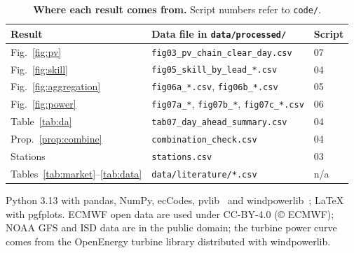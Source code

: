 \begin{table}[h]
\centering\small
\caption{\textbf{Where each result comes from.} Script numbers refer to \texttt{code/}.}
\label{tab:map}
\setlength{\tabcolsep}{3pt}
\begin{tabular}{@{}L{1.55cm}L{4.95cm}l@{}}
\toprule
Result & Data file in \texttt{data/processed/} & Script \\
\midrule
Fig.~\ref{fig:pv} & \nolinkurl{fig03_pv_chain_clear_day.csv} & 07 \\
Fig.~\ref{fig:skill} & \nolinkurl{fig05_skill_by_lead_*.csv} & 04 \\
Fig.~\ref{fig:aggregation} & \nolinkurl{fig06a_*.csv}, \nolinkurl{fig06b_*.csv} & 05 \\
Fig.~\ref{fig:power} & \nolinkurl{fig07a_*}, \nolinkurl{fig07b_*}, \nolinkurl{fig07c_*.csv} & 06 \\
Table~\ref{tab:da} & \nolinkurl{tab07_day_ahead_summary.csv} & 04 \\
Prop.~\ref{prop:combine} & \nolinkurl{combination_check.csv} & 04 \\
Stations & \nolinkurl{stations.csv} & 03 \\
Tables~\ref{tab:market}--\ref{tab:data} & \nolinkurl{data/literature/*.csv} & n/a \\
\bottomrule
\end{tabular}
\end{table}

 Python 3.13 with pandas, NumPy, ecCodes, pvlib~\cite{holmgren2018pvlib} and windpowerlib~\cite{windpowerlib}; \LaTeX{} with pgfplots. ECMWF open data are used under CC-BY-4.0 (\copyright{} ECMWF); NOAA GFS and ISD data are in the public domain; the turbine power curve comes from the OpenEnergy turbine library distributed with windpowerlib.
